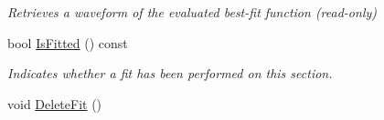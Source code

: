 \begin{DoxyCompactItemize}
\begin{DoxyCompactList}\small\item\em Retrieves a waveform of the evaluated best-\/fit function (read-\/only) \item\end{DoxyCompactList}\item 
bool \hyperlink{classSection_a333306824e7d67daae711f9cfda5db1d}{IsFitted} () const 
\begin{DoxyCompactList}\small\item\em Indicates whether a fit has been performed on this section. \item\end{DoxyCompactList}\item 
\hypertarget{classSection_af0ed8295201e0b28a90545d315e1c362}{
void \hyperlink{classSection_af0ed8295201e0b28a90545d315e1c362}{DeleteFit} ()}
\label{classSection_af0ed8295201e0b28a90545d315e1c362}


\end{DoxyCompactItemize}
